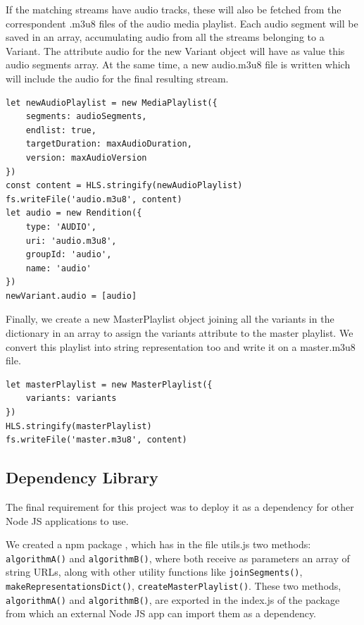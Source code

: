 If the matching streams have audio tracks, these will also be fetched from the correspondent .m3u8 files of the audio media playlist. Each audio segment will be saved in an array, accumulating audio from all the streams belonging to a Variant. The attribute audio for the new Variant object will have as value this audio segments array. At the same time, a new audio.m3u8 file is written which will include the audio for the final resulting stream. 
\begin{lstlisting}
let newAudioPlaylist = new MediaPlaylist({
    segments: audioSegments,
    endlist: true,
    targetDuration: maxAudioDuration,
    version: maxAudioVersion
})
const content = HLS.stringify(newAudioPlaylist)
fs.writeFile('audio.m3u8', content)
let audio = new Rendition({
    type: 'AUDIO',
    uri: 'audio.m3u8',
    groupId: 'audio',
    name: 'audio'
})
newVariant.audio = [audio]
\end{lstlisting}
Finally, we create a new MasterPlaylist object joining all the variants in the dictionary in an array to assign the variants attribute to the master playlist. We convert this playlist into string representation too and write it on a master.m3u8 file.

\begin{lstlisting}
let masterPlaylist = new MasterPlaylist({
    variants: variants
})
HLS.stringify(masterPlaylist)
fs.writeFile('master.m3u8', content)
\end{lstlisting}

\subsection{Dependency Library}

The final requirement for this project was to deploy it as a dependency for other Node JS applications to use.

We created a npm package \cite{npm}, which has in the file utils.js two methods: \Verb|algorithmA()| and \Verb|algorithmB()|, where both receive as parameters an array of string URLs, along with other utility functions like \Verb|joinSegments()|, \Verb|makeRepresentationsDict()|, \Verb|createMasterPlaylist()|. These two methods, \Verb|algorithmA()| and \Verb|algorithmB()|, are exported in the index.js of the package from which an external Node JS app can import them as a dependency.